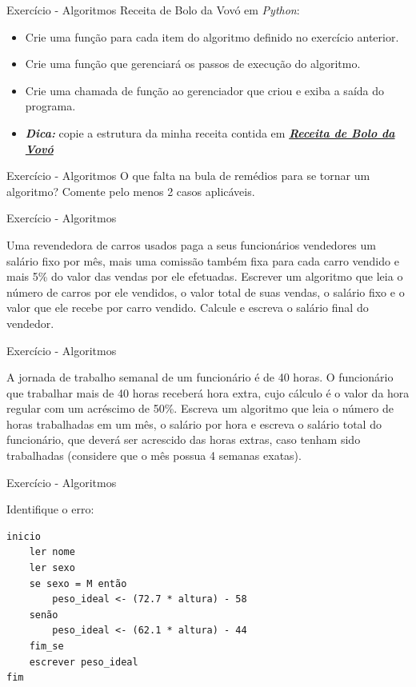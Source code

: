 \documentclass{beamer}
\begin{document}
\begin{frame}{Exercício - Algoritmos}
	\label{exercicio_02}
	Receita de Bolo da Vovó em \textit{Python}:
	\begin{itemize}
		\item Crie uma função para cada item do algoritmo definido no exercício anterior.
		\item Crie uma função que gerenciará os passos de execução do algoritmo.
		\item Crie uma chamada de função ao gerenciador que criou e exiba a saída do programa.
		\item \textbf{\textit{Dica:}} copie a estrutura da minha receita contida em \href{Exercicios/Modulo_01/exercicio_01/receita_de_bolo.py}{\textbf{\textit{Receita de Bolo da Vovó}}}
	\end{itemize}
\end{frame}

\begin{frame}{Exercício - Algoritmos}
	\label{exercicio_04}
	 O que falta na bula de remédios para se tornar um algoritmo? Comente pelo menos 2 casos aplicáveis.
\end{frame}

\begin{frame}{Exercício - Algoritmos}
	\label{exercicio_05}
	
	Uma revendedora de carros usados paga a seus funcionários vendedores um salário fixo por mês,	mais uma comissão também fixa para cada carro vendido e mais 5\% do valor das vendas por ele	efetuadas. Escrever um algoritmo que leia o número de carros por ele vendidos, o valor total de suas vendas, o salário fixo e o valor que ele recebe por carro vendido. Calcule e escreva o salário final do vendedor.
	
\end{frame}

\begin{frame}{Exercício - Algoritmos}
	\label{exercicio_06}
	
	A jornada de trabalho semanal de um funcionário é de 40 horas. O funcionário que trabalhar mais	de 40 horas receberá hora extra, cujo cálculo é o valor da hora regular com um acréscimo de 50\%.
	Escreva um algoritmo que leia o número de horas trabalhadas em um mês, o salário por hora e escreva o salário total do funcionário, que deverá ser acrescido das horas extras, caso tenham sido trabalhadas (considere que o mês possua 4 semanas exatas).
\end{frame}

\begin{frame}[fragile]{Exercício - Algoritmos}
	\label{exercicio_07}
	
	Identifique o erro:
	\begin{verbatim}
inicio
	ler nome
	ler sexo
	se sexo = M então
		peso_ideal <- (72.7 * altura) - 58
	senão
		peso_ideal <- (62.1 * altura) - 44
	fim_se
	escrever peso_ideal
fim
	\end{verbatim}
\end{frame}
\end{document}
